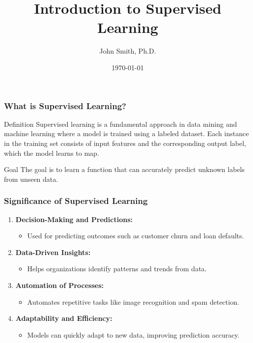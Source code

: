 \documentclass[aspectratio=169]{beamer}
\begin{document}
\frame{\titlepage}

\begin{frame}[fragile]
  \title{Introduction to Supervised Learning}
  \author{John Smith, Ph.D.}
  \date{\today}
  \titlepage
\end{frame}

\begin{frame}[fragile]
  \frametitle{What is Supervised Learning?}
  \begin{block}{Definition}
    Supervised learning is a fundamental approach in data mining and machine learning where a model is trained using a labeled dataset. Each instance in the training set consists of input features and the corresponding output label, which the model learns to map.
  \end{block}
  \begin{block}{Goal}
    The goal is to learn a function that can accurately predict unknown labels from unseen data.
  \end{block}
\end{frame}

\begin{frame}[fragile]
  \frametitle{Significance of Supervised Learning}
  \begin{enumerate}
    \item \textbf{Decision-Making and Predictions:}
      \begin{itemize}
        \item Used for predicting outcomes such as customer churn and loan defaults.
      \end{itemize}
    
    \item \textbf{Data-Driven Insights:}
      \begin{itemize}
        \item Helps organizations identify patterns and trends from data.
      \end{itemize}

    \item \textbf{Automation of Processes:}
      \begin{itemize}
        \item Automates repetitive tasks like image recognition and spam detection.
      \end{itemize}

    \item \textbf{Adaptability and Efficiency:}
      \begin{itemize}
        \item Models can quickly adapt to new data, improving prediction accuracy.
      \end{itemize}
  \end{enumerate}
\end{frame}
\end{document}
